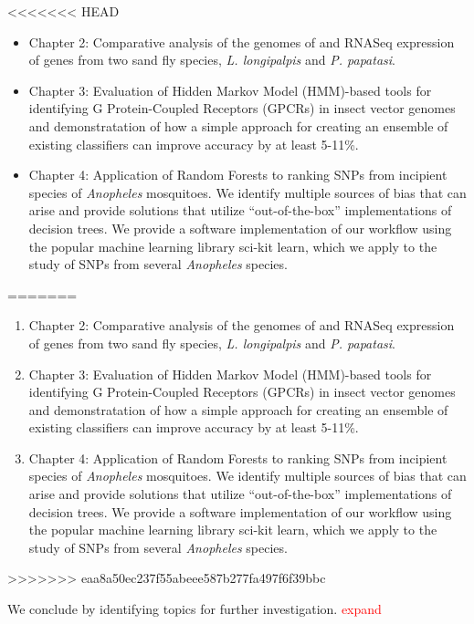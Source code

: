 <<<<<<< HEAD
\begin{itemize}
\item Chapter 2: Comparative analysis of the genomes of and RNASeq expression of genes from two sand fly species, \emph{L. longipalpis} and \emph{P. papatasi}.
\item Chapter 3: Evaluation of Hidden Markov Model (HMM)-based tools for identifying G Protein-Coupled Receptors (GPCRs) in insect vector genomes and demonstratation of how a simple approach for creating an ensemble of existing classifiers can improve accuracy by at least 5-11\%.
\item Chapter 4: Application of Random Forests to ranking SNPs from incipient species of \emph{Anopheles} mosquitoes.  We identify multiple sources of bias that can arise and provide solutions that utilize ``out-of-the-box'' implementations of decision trees.  We provide a software implementation of our workflow using the popular machine learning library sci-kit learn, which we apply to the study of SNPs from several \emph{Anopheles} species.
\end{itemize}
=======
\begin{enumerate}
\item Chapter 2: Comparative analysis of the genomes of and RNASeq expression of genes from two sand fly species, \emph{L. longipalpis} and \emph{P. papatasi}.
\item Chapter 3: Evaluation of Hidden Markov Model (HMM)-based tools for identifying G Protein-Coupled Receptors (GPCRs) in insect vector genomes and demonstratation of how a simple approach for creating an ensemble of existing classifiers can improve accuracy by at least 5-11\%.
\item Chapter 4: Application of Random Forests to ranking SNPs from incipient species of \emph{Anopheles} mosquitoes.  We identify multiple sources of bias that can arise and provide solutions that utilize ``out-of-the-box'' implementations of decision trees.  We provide a software implementation of our workflow using the popular machine learning library sci-kit learn, which we apply to the study of SNPs from several \emph{Anopheles} species.
\end{enumerate}
>>>>>>> eaa8a50ec237f55abeee587b277fa497f6f39bbc

We conclude by identifying topics for further investigation. \textcolor{red}{expand}
